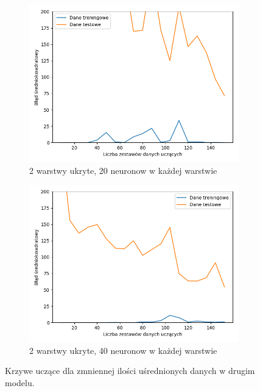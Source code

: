 \documentclass[12pt]{aghdpl}
\begin{document}
\begin{figure}[h]
		 	\begin{subfigure}{.5\linewidth}
		 		\includegraphics[width =\linewidth]{wykresy/5_usrednianie_danych/2_warstwy_20_neuronow_learning_curves.png}
		 		\caption{2 warstwy ukryte, 20 neuronow w każdej warstwie}
		 	\end{subfigure}
		 	\begin{subfigure}{.5\linewidth}
		 		\includegraphics[width =\linewidth]{wykresy/5_usrednianie_danych/2_warstwy_40_neuronow_learning_curves.png}
		 		\caption{2 warstwy ukryte, 40 neuronow w każdej warstwie}
		 	\end{subfigure}
	 	
 			\caption{Krzywe uczące dla zmniennej ilości uśrednionych danych w drugim modelu.}
			\label{fig: drugi_model_przy_usrednionych_danych_learning_curves}
		\end{figure}
		
\end{document}
